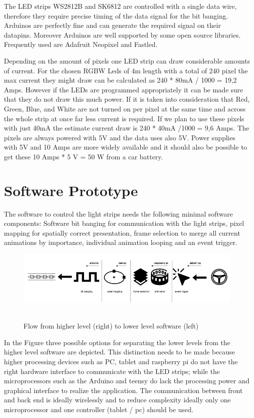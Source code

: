 The LED strips WS2812B and SK6812 are controlled with a single data wire, therefore they require precise timing of the data signal for the bit banging. Arduinos are perfectly fine and can generate the required signal on their datapins. Moreover Arduinos are well supported by some open source libraries. Frequently used are Adafruit Neopixel and Fastled. 

Depending on the amount of pixels one LED strip can draw considerable amounts of current. For the chosen RGBW Leds of 4m length with a total of 240 pixel the max current they might draw can be calculated as 240 * 80mA / 1000 = 19,2 Amps. However if the LEDs are programmed appropriately it can be made sure that they do not draw this much power. If it is taken into consideration that Red, Green, Blue, and White are not turned on per pixel at the same time and across the whole strip at once far less current is required. If we plan to use these pixels with just 40mA the estimate current draw is 240 * 40mA /1000 = 9,6 Amps. The pixels are always powered with 5V and the data uses also 5V. Power supplies with 5V and 10 Amps are more widely available and it should also be possible to get these 10 Amps * 5 V = 50 W from a car battery. 

\chapter{Software Prototype}
The software to control the light strips needs the following minimal software components:
Software bit banging for communication with the light strips, pixel mapping for spatially correct presentation, frame selection to merge all current animations by importance, individual animation looping and an event trigger. 

\begin{figure}
    \includegraphics[width=1\textwidth]{fig/softwareflow-}\hfill\
    \caption[Software Flow]{Flow from higher level (right) to lower level software (left)}
    \label{fig:flow}
\end{figure}

In the Figure  three possible options for separating the lower levels from the higher level software are depicted. This distinction needs to be made because higher processing devices such as PC, tablet and raspberry pi do not have the right hardware interface to communicate with the LED strips; while the microprocessors such as the Arduino and teensy do lack the processing power and graphical interface to realize the application. 
The communication between front and back end is ideally wirelessly and to reduce complexity ideally only one microprocessor and one controller (tablet / pc) should be used.  

